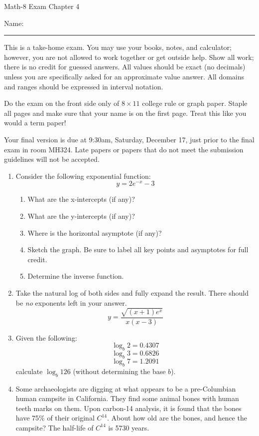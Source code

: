 \documentclass[letterpaper,12pt,fleqn]{article}
\begin{document}
\begin{center}
  \Large Math-8 Exam Chapter 4
\end{center}

\vspace{0.5in}

Name: \rule{4in}{1pt}

\vspace{0.5in}

This is a take-home exam. You may use your books, notes, and calculator;
however, you are not allowed to work together or get outside help. Show all
work; there is no credit for guessed answers. All values should be exact
(no decimals) unless you are specifically asked for an approximate value
answer. All domains and ranges should be expressed in interval notation.

\begin{textbf}
  Do the exam on the front side only of $8\times11$ college rule or
  graph paper. Staple all pages and make sure that your name is on the first
  page. Treat this like you would a term paper!

  Your final version is due at 9:30am, Saturday, December 17, just prior to
  the final exam in room MH324. Late papers or papers that do not meet the
  submission guidelines will not be accepted.
\end{textbf}

\vspace{0.5in}

\begin{enumerate}
\item Consider the following exponential function:
  \[y=2e^{-x}-3\]
  \begin{enumerate}
  \item What are the x-intercepts (if any)?
  \item What are the y-intercepts (if any)?
  \item Where is the horizontal asymptote (if any)?
  \item Sketch the graph. Be sure to label all key points and asymptotes
    for full credit.
  \item Determine the inverse function.
  \end{enumerate}

\item Take the natural log of both sides and fully expand the result. There
  should be \emph{no} exponents left in your answer.
  \[y=\frac{\sqrt{(x+1)e^x}}{x(x-3)}\]

\item Given the following:
  \[\log_b{2}=0.4307\]
  \[\log_b{3}=0.6826\]
  \[\log_b{7}=1.2091\]
  calculate $\log_b{126}$ (without determining the base $b$).
  
\item Some archaeologists are digging at what appears to be a pre-Columbian
  human campsite in California.  They find some animal bones with human teeth
  marks on them.  Upon carbon-14 analysis, it is found that the bones have 75\%
  of their original $C^{14}$.  About how old are the bones, and hence the
  campsite?  The half-life of $C^{14}$ is 5730 years.
\end{enumerate}
\end{document}
